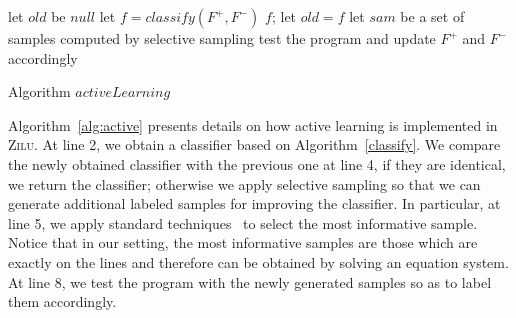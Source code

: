 

\begin{algorithm}[b]
\SetAlgoVlined
\Indm
{}
\Indp
let $old$ be $null$\;
 {
    let $f = classify(F^+, F^-)$\;
     {
        \Return $f$;
    }
    let $old = f$\;
    let $sam$ be a set of samples computed by selective sampling\;
    test the program and update $F^+$ and $F^-$ accordingly\;
}
\caption{Algorithm $activeLearning$}
\label{alg:active}
\end{algorithm}

Algorithm~\ref{alg:active} presents details on how active learning is implemented in \textsc{Zilu}. 
At line 2, we obtain a classifier based on Algorithm~\ref{classify}. 
We compare the newly obtained classifier with the previous one at line 4, if they are identical, we return the classifier; 
otherwise we apply selective sampling so that we can generate additional labeled samples for improving the classifier. 
In particular, at line 5, we apply standard techniques~\cite{DBLP:conf/icml/SchohnC00} to select the most informative sample. 
Notice that in our setting, the most informative samples are those which are exactly on the lines and therefore can be obtained by solving an equation system. 
At line 8, we test the program with the newly generated samples so as to label them accordingly.

